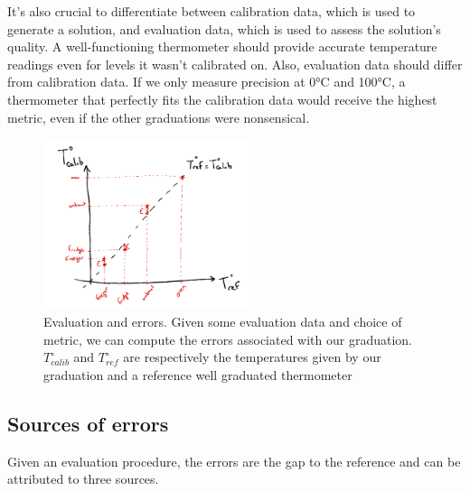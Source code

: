 \begin{bibunit}
It's also crucial to differentiate between calibration data, which is used to generate a solution, and evaluation data, which is used to assess the solution's quality.
A well-functioning thermometer should provide accurate temperature readings even for levels it wasn't calibrated on. Also, evaluation data should differ from calibration data. If we only measure precision at 0°C and 100°C, a thermometer that perfectly fits the calibration data would receive the highest metric, even if the other graduations were nonsensical.

\begin{figure}
\includegraphics[clip, width=6cm]{Introduction/pics/errors.png}  
    \centering
    \caption{Evaluation and errors. Given some evaluation data and choice of metric, we can compute the errors associated with our graduation. $T^{\circ}_{calib}$ and $T^{\circ}_{ref}$ are respectively the temperatures given by our graduation and a reference well graduated thermometer}
    \label{fig:err_sources}
\end{figure}



 \subsection{Sources of errors}

Given an evaluation procedure, the errors are the gap to the reference and can be attributed to three sources.


\end{bibunit}
